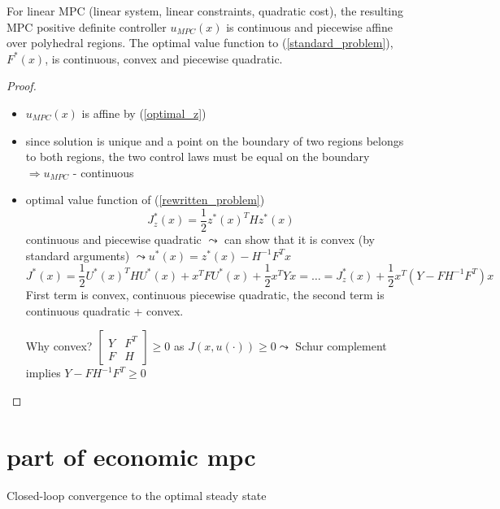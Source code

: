 \begin{Theorem}
For linear MPC (linear system, linear constraints, quadratic cost), the resulting MPC positive definite controller $u_{MPC}(x)$ is continuous and piecewise affine over polyhedral regions. The optimal value function to (\ref{standard_problem}), $F^*(x)$, is continuous, convex and piecewise quadratic.
\begin{proof}
\begin{itemize}
\item $u_{MPC}(x)$ is affine by (\ref{optimal_z})
\item since solution is unique and a point on the boundary of two regions belongs to both regions, the two control laws must be equal on the boundary $\Rightarrow u_{MPC}$ - continuous
\item optimal value function of (\ref{rewritten_problem})
\begin{equation*}
J_z^*(x) = \frac{1}{2}z^*(x)^THz^*(x) 
\end{equation*} 
continuous and piecewise quadratic
$\leadsto$ can show that it is convex (by standard arguments) $\leadsto u^*(x) = z^*(x) - H^{-1}F^Tx$
\begin{equation*}
J^*(x) = \frac{1}{2}U^*(x)^THU^*(x) + x^TFU^*(x) + \frac{1}{2}x^TYx = \dots = J_z^*(x) + \frac{1}{2}x^T(Y-FH^{-1}F^T)x
\end{equation*}
First term is convex, continuous piecewise quadratic, the second term is continuous quadratic + convex.

Why convex?
$\begin{bmatrix}
Y & F^T \\
F & H
\end{bmatrix} \geq 0$ as $J(x,u(\cdot)) \geq 0 \leadsto$ Schur complement implies $Y-FH^{-1}F^T \geq 0$ 
\end{itemize}
\end{proof}
\end{Theorem}

\section{part of economic mpc}
Closed-loop convergence to the optimal steady state

